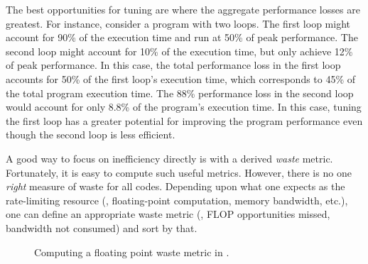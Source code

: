 \documentclass[11pt,letterpaper]{report}
\begin{document}
The best opportunities for tuning are where the aggregate performance losses are greatest.
For instance, consider a program with two loops.
The first loop might account for 90\% of the execution time and run at 50\% of peak performance.
The second loop might account for 10\% of the execution time, but only achieve 12\% of peak performance.
In this case, the total performance loss in the first loop accounts for 50\% of the first loop's execution time, which corresponds to 45\% of the total program execution time.
The 88\% performance loss in the second loop would account for only 8.8\% of the program's execution time.
In this case, tuning the first loop has a greater potential for improving the program performance even though the second loop is less efficient.

A good way to focus on inefficiency directly is with a derived {\em waste} metric.
Fortunately, it is easy to compute such useful metrics.
However, there is no one {\em right} measure of waste for all codes.
Depending upon what one expects as the rate-limiting resource (\eg, floating-point computation, memory bandwidth, etc.), one can define an appropriate waste metric (\eg, FLOP opportunities missed, bandwidth not consumed) and sort by that.


\begin{figure}[t]
\caption{Computing a floating point waste metric in \hpcviewer{}.}
\label{fig:fpwaste}
\end{figure}
\end{document}
